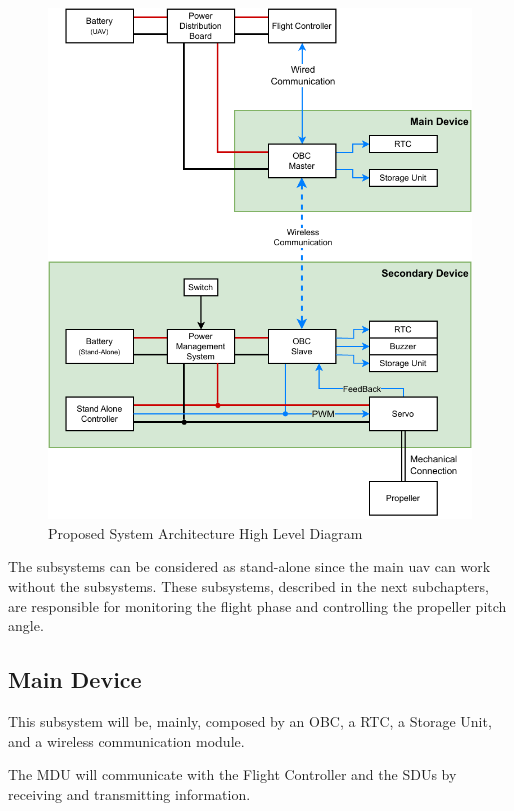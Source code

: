 \begin{figure}[H]
    \centering
    \includegraphics[scale=1]{ch4/assets/system_diagram.pdf}
    \caption{Proposed System Architecture High Level Diagram}
    \label{fig:system_diagram}
\end{figure}

The subsystems can be considered as stand-alone since the main \gls{uav} can work without the subsystems.
These subsystems, described in the next subchapters, are responsible for monitoring the flight phase and controlling the propeller pitch angle.

\subsection{Main Device}
This subsystem will be, mainly, composed by an \gls{OBC}, a \gls{RTC}, a Storage Unit, and a wireless communication module.

The MDU will communicate with the Flight Controller and the SDUs by receiving and transmitting information.

